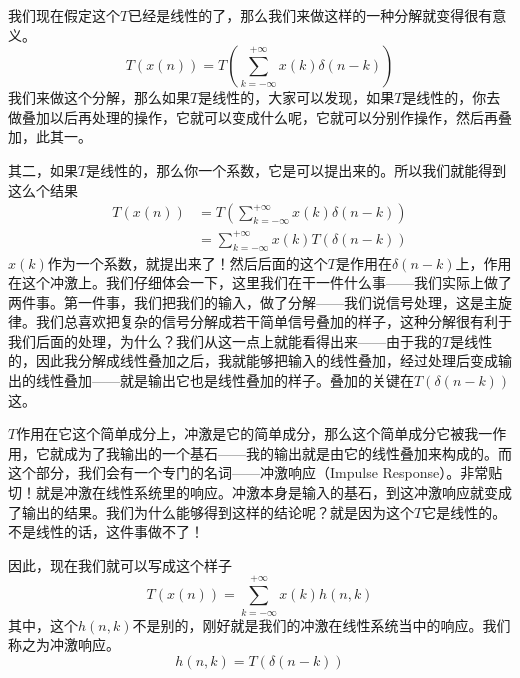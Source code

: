 \documentclass[a4paper,12pt]{article}
\begin{document}
我们现在假定这个$T$已经是线性的了，那么我们来做这样的一种分解就变得很有意义。
\begin{equation}
   T\left ( x(n) \right ) = T\left ( \sum_{k=-\infty}^{+\infty}x(k)\delta (n-k) \right )
\end{equation}
我们来做这个分解，那么如果$T$是线性的，大家可以发现，如果$T$是线性的，你去做叠加以后再处理的操作，它就可以变成什么呢，它就可以分别作操作，然后再叠加，此其一。

其二，如果$T$是线性的，那么你一个系数，它是可以提出来的。所以我们就能得到这么个结果
\begin{equation}
\begin{aligned} 
  T\left ( x(n) \right ) &= T\left ( \sum\limits _{k=-\infty}^{+\infty}x(k)\delta (n-k) \right ) \\
&= \sum\limits _{k=-\infty}^{+\infty}x(k)T\left ( \delta (n-k) \right ) 
\end{aligned}
\end{equation}
$x(k)$作为一个系数，就提出来了！然后后面的这个$T$是作用在$\delta (n-k)$上，作用在这个冲激上。我们仔细体会一下，这里我们在干一件什么事——我们实际上做了两件事。第一件事，我们把我们的输入，做了分解——我们说信号处理，这是主旋律。我们总喜欢把复杂的信号分解成若干简单信号叠加的样子，这种分解很有利于我们后面的处理，为什么？我们从这一点上就能看得出来——由于我的$T$是线性的，因此我分解成线性叠加之后，我就能够把输入的线性叠加，经过处理后变成输出的线性叠加——就是输出它也是线性叠加的样子。叠加的关键在$T(\delta (n-k))$这。

$T$作用在它这个简单成分上，冲激是它的简单成分，那么这个简单成分它被我一作用，它就成为了我输出的一个基石——我的输出就是由它的线性叠加来构成的。而这个部分，我们会有一个专门的名词——冲激响应（Impulse Response）。非常贴切！就是冲激在线性系统里的响应。冲激本身是输入的基石，到这冲激响应就变成了输出的结果。我们为什么能够得到这样的结论呢？就是因为这个$T$它是线性的。不是线性的话，这件事做不了！

因此，现在我们就可以写成这个样子
\begin{equation}
   T\left ( x(n) \right ) = \sum_{k=-\infty}^{+\infty}x(k)h(n,k)
\end{equation}
其中，这个$h(n,k)$不是别的，刚好就是我们的冲激在线性系统当中的响应。我们称之为冲激响应。
\begin{equation}
   h(n,k) = T(\delta (n-k))
\end{equation}
\end{document}
